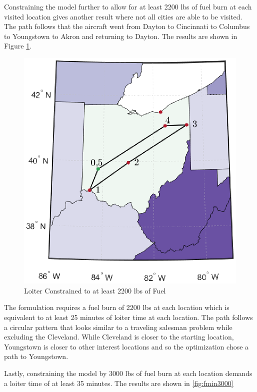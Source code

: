 Constraining the model further to allow for at least 2200 lbs of fuel burn at each visited location gives another result where not all cities are able to be visited. The path follows that the aircraft went from Dayton to Cincinnati to Columbus to Youngstown to Akron and returning to Dayton. The results are shown in Figure \ref{fig:fmin2200}.
\begin{figure}[H]
    \centering
    \includegraphics{Thesis/Method_II/fmin2200.eps}
    \caption{Loiter Constrained to at least 2200 lbs of Fuel}
    \label{fig:fmin2200}
\end{figure}
The formulation requires a fuel burn of 2200 lbs at each location which is equivalent to at least 25 minutes of loiter time at each location. The path follows a circular pattern that looks similar to a traveling salesman problem while excluding the Cleveland. While Cleveland is closer to the starting location, Youngstown is closer to other interest locations and so the optimization chose a path to Youngstown.\par
Lastly, constraining the model by 3000 lbs of fuel burn at each location demands a loiter time of at least 35 minutes. The results are shown in \ref{fig:fmin3000}
